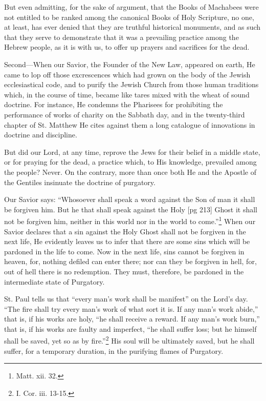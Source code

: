 But even admitting, for the sake of argument,
that the Books of Machabees were not entitled to
be ranked among the canonical Books of Holy
Scripture, no one, at least, has ever denied that
they are truthful historical monuments, and as
such that they serve to demonstrate that it was a
prevailing practice among the Hebrew people, as
it is with us, to offer up prayers and sacrifices for
the dead.

Second—When our Savior, the Founder of the
New Law, appeared on earth, He came to lop off
those excrescences which had grown on the body
of the Jewish ecclesiastical code, and to purify
the Jewish Church from those human traditions
which, in the course of time, became like tares
mixed with the wheat of sound doctrine. For instance,
He condemns the Pharisees for prohibiting
the performance of works of charity on the
Sabbath day, and in the twenty-third chapter of
St. Matthew He cites against them a long catalogue
of innovations in doctrine and discipline.

But did our Lord, at any time, reprove the
Jews for their belief in a middle state, or for
praying for the dead, a practice which, to His
knowledge, prevailed among the people? Never.
On the contrary, more than once both He and the
Apostle of the Gentiles insinuate the doctrine of
purgatory.

Our Savior says: “Whosoever shall speak a
word against the Son of man it shall be forgiven
him. But he that shall speak against the Holy
[pg 213]
Ghost it shall not be forgiven him, neither in this
world nor in the world to come.”\footnote{Matt. xii. 32.} When our
Savior declares that a sin against the Holy Ghost
shall not be forgiven in the next life, He evidently
leaves us to infer that there are some sins which
will be pardoned in the life to come. Now in the
next life, sins cannot be forgiven in heaven, for,
nothing defiled can enter there; nor can they be
forgiven in hell, for, out of hell there is no redemption.
They must, therefore, be pardoned in the
intermediate state of Purgatory.

St. Paul tells us that “every man's work shall
be manifest” on the Lord's day. “The fire shall
try every man's work of what sort it is. If any
man's work abide,” that is, if his works are holy,
“he shall receive a reward. If any man's work
burn,” that is, if his works are faulty and imperfect,
“he shall suffer loss; but he himself shall
be saved, yet so as by fire.”\footnote{I.
Cor. iii. 13-15.} His soul will be
ultimately saved, but he shall suffer, for a temporary
duration, in the purifying flames of Purgatory.

